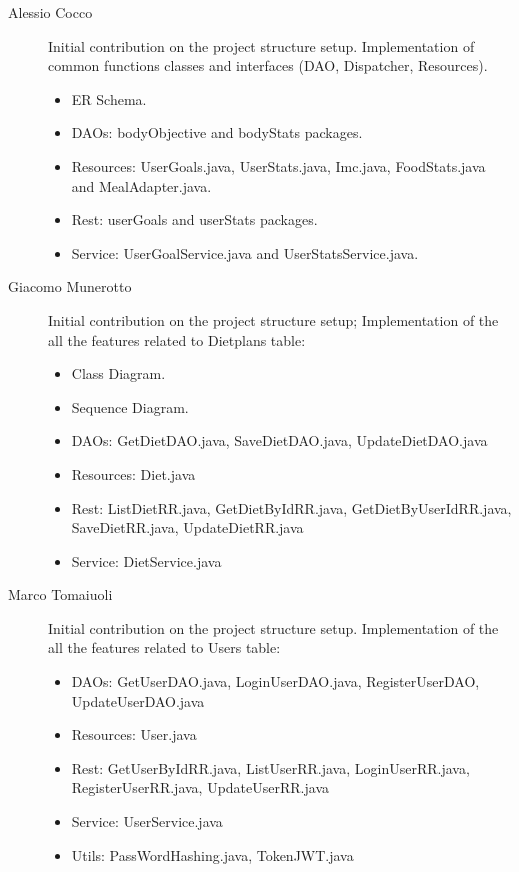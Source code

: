 \begin{description}
\item[Alessio Cocco] Initial contribution on the project structure setup. Implementation of common functions classes and interfaces (DAO, Dispatcher, Resources).
    \begin{itemize}
        \item ER Schema.
        \item DAOs: bodyObjective and bodyStats packages.
        \item Resources: UserGoals.java, UserStats.java, Imc.java, FoodStats.java and MealAdapter.java.
        \item Rest: userGoals and userStats packages.
        \item Service: UserGoalService.java and UserStatsService.java.
    \end{itemize}
    
\item[Giacomo Munerotto] Initial contribution on the project structure setup; Implementation of the all the features related to Dietplans table:
    \begin{itemize}
        \item Class Diagram.
        \item Sequence Diagram.
        \item DAOs: GetDietDAO.java, SaveDietDAO.java, UpdateDietDAO.java
        \item Resources: Diet.java
        \item Rest: ListDietRR.java, GetDietByIdRR.java, GetDietByUserIdRR.java, SaveDietRR.java, UpdateDietRR.java
        \item Service: DietService.java
    \end{itemize}
    
\item[Marco Tomaiuoli] Initial contribution on the project structure setup. 
 Implementation of the all the features related to Users table:
    \begin{itemize}
        \item DAOs: GetUserDAO.java, LoginUserDAO.java, RegisterUserDAO, UpdateUserDAO.java
        \item Resources: User.java
        \item Rest: GetUserByIdRR.java, ListUserRR.java, LoginUserRR.java, RegisterUserRR.java, UpdateUserRR.java
        \item Service: UserService.java
        \item Utils: PassWordHashing.java, TokenJWT.java
    \end{itemize}
    

\end{description}
